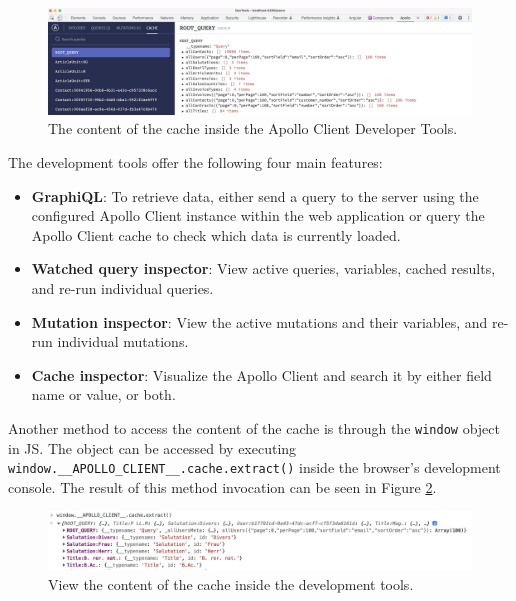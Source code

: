 \ifshowImages
\begin{figure}[H]
  \centering
  \includegraphics[width=1\linewidth]{images/background/graphql/apollo/apollo-dev-tools.jpg}
  \caption{The content of the cache inside the Apollo Client Developer Tools.}\label{fig:background:graphql:apollo:apollo-dev-tools}
\end{figure}
\fi

\noindent The development tools offer the following four main features: \cite{misc:-:background:graphql:apollo-developer-tools}

\begin{itemize}
  \item \textbf{GraphiQL}: To retrieve data, either send a query to the server using the configured Apollo Client instance within the web application or query the Apollo Client cache to check which data is currently loaded.
  \item \textbf{Watched query inspector}: View active queries, variables, cached results, and re-run individual queries.
  \item \textbf{Mutation inspector}: View the active mutations and their variables, and re-run individual mutations.
  \item \textbf{Cache inspector}: Visualize the Apollo Client and search it by either field name or value, or both.
\end{itemize}

\noindent Another method to access the content of the cache is through the \texttt{window} object in \ac{JS}. The object can be accessed by executing \texttt{window.\_\_APOLLO\_CLIENT\_\_.cache.extract()} inside the browser's development console. The result of this method invocation can be seen in Figure \ref{fig:background:graphql:apollo:apollo-cache-browser-window}.

\ifshowImages
  \begin{figure}[H]
    \centering
    \includegraphics[width=1\linewidth]{images/background/graphql/apollo/apollo-cache-browser-window.jpg}
    \caption{View the content of the cache inside the development tools.}\label{fig:background:graphql:apollo:apollo-cache-browser-window}
  \end{figure}
\fi

